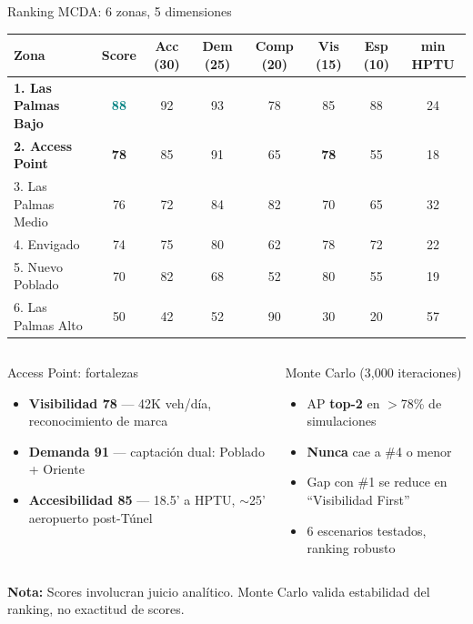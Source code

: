 \documentclass[aspectratio=169, 11pt]{beamer}
\newcommand{\highlight}[1]{\textcolor{teal}{\textbf{#1}}}
\begin{document}
\begin{frame}{Ranking MCDA: 6 zonas, 5 dimensiones}
\vspace{-4pt}
{\scriptsize\setlength{\tabcolsep}{3.5pt}
\begin{tabular}{@{}lccccccc@{}}
\toprule
\textbf{Zona} & \textbf{Score} & \textbf{Acc (30)} & \textbf{Dem (25)} & \textbf{Comp (20)} & \textbf{Vis (15)} & \textbf{Esp (10)} & \textbf{min HPTU} \\
\midrule
\rowcolor{teal!12}
\textbf{1. Las Palmas Bajo} & \highlight{88} & 92 & 93 & 78 & 85 & 88 & 24 \\
\rowcolor{rose!10}
\textbf{2. Access Point} & \textcolor{rose}{\textbf{78}} & 85 & 91 & 65 & \textcolor{rose}{\textbf{78}} & 55 & 18 \\
3. Las Palmas Medio & 76 & 72 & 84 & 82 & 70 & 65 & 32 \\
4. Envigado & 74 & 75 & 80 & 62 & 78 & 72 & 22 \\
5. Nuevo Poblado & 70 & 82 & 68 & 52 & 80 & 55 & 19 \\
\rowcolor{coral!8}
6. Las Palmas Alto & 50 & 42 & 52 & 90 & 30 & 20 & 57 \\
\bottomrule
\end{tabular}
}

\vspace{3pt}
\begin{columns}[T]
\begin{exampleblock}{\small Access Point: fortalezas}
\scriptsize
\begin{itemize}\setlength{\itemsep}{0pt}
  \item \textcolor{rose}{\textbf{Visibilidad 78}} --- 42K veh/día, reconocimiento de marca
  \item \textbf{Demanda 91} --- captación dual: Poblado + Oriente
  \item \textbf{Accesibilidad 85} --- 18.5' a HPTU, $\sim$25' aeropuerto post-Túnel
\end{itemize}
\end{exampleblock}

\begin{alertblock}{\small Monte Carlo (3,000 iteraciones)}
\scriptsize
\begin{itemize}\setlength{\itemsep}{0pt}
  \item AP \textbf{top-2} en $>$78\% de simulaciones
  \item \textbf{Nunca} cae a \#4 o menor
  \item Gap con \#1 se reduce en ``Visibilidad First''
  \item 6 escenarios testados, ranking robusto
\end{itemize}
\end{alertblock}
\end{columns}
\vspace{1pt}
{\tiny\textcolor{slate}{\textbf{Nota:}} Scores involucran juicio analítico. Monte Carlo valida estabilidad del ranking, no exactitud de scores.}
\end{frame}
\end{document}
